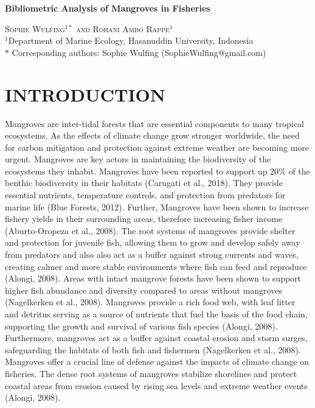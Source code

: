 \documentclass[
  12pt,
]{article}
\author{}
\date{\vspace{-2.5em}}
\begin{document}
\doublespacing

\begin{center}
    
\textbf{\Large Bibliometric Analysis of Mangroves in Fisheries}
    
\textsc{Sophie Wulfing$^{1*}$ and Rohani Ambo Rappe$^{1}$\\}
\vspace{3 mm}
\normalsize{\indent $^1$Department of Marine Ecology, Hasanuddin University, Indonesia\\}
$\text{*}$ Corresponding authors: Sophie Wulfing (SophieWulfing@gmail.com)
\end{center}

\newpage

\hypertarget{introduction}{%
\section{INTRODUCTION}\label{introduction}}

Mangroves are inter-tidal forests that are essential components to many tropical ecosystems. As the effects of climate change grow stronger worldwide, the need for carbon mitigation and protection against extreme weather are becoming more urgent. Mangroves are key actors in maintaining the biodiversity of the ecosystems they inhabit. Mangroves have been reported to support up 20\% of the benthic biodiversity in their habitats (Carugati et al., 2018). They provide essential nutrients, temperature controls, and protection from predators for marine life (Blue Forests, 2012). Further, Mangroves have been shown to increase fishery yields in their surrounding areas, therefore increasing fisher income (Aburto-Oropeza et al., 2008). The root systems of mangroves provide shelter and protection for juvenile fish, allowing them to grow and develop safely away from predators and also also act as a buffer against strong currents and waves, creating calmer and more stable environments where fish can feed and reproduce (Alongi, 2008). Areas with intact mangrove forests have been shown to support higher fish abundance and diversity compared to areas without mangroves (Nagelkerken et al., 2008). Mangroves provide a rich food web, with leaf litter and detritus serving as a source of nutrients that fuel the basis of the food chain, supporting the growth and survival of various fish species (Alongi, 2008). Furthermore, mangroves act as a buffer against coastal erosion and storm surges, safeguarding the habitats of both fish and fishermen (Nagelkerken et al., 2008). Mangroves offer a crucial line of defense against the impacts of climate change on fisheries. The dense root systems of mangroves stabilize shorelines and protect coastal areas from erosion caused by rising sea levels and extreme weather events (Alongi, 2008).
\end{document}
